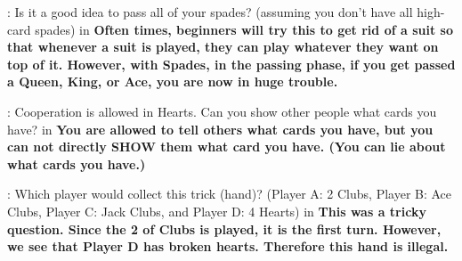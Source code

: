 \documentclass[11.5pt]{article}
\begin{document}
\vskip 0.16in

: Is it a good idea to pass all of your spades? (assuming you don't have all high-card spades)
 in
\indent \textbf{Often times, beginners will try this to get rid of a suit so that whenever a suit is played, they can play whatever they want on top of it. However, with Spades, in the passing phase, if you get passed a Queen, King, or Ace, you are now in huge trouble.}

\vskip 0.16in

: Cooperation is allowed in Hearts. Can you show other people what cards you have?
 in
\indent \textbf{You are allowed to tell others what cards you have, but you can not directly SHOW them what card you have. (You can lie about what cards you have.)}

\vskip 0.16in

: Which player would collect this trick (hand)? (Player A: 2 Clubs, Player B: Ace Clubs, Player C: Jack Clubs, and Player D: 4 Hearts)
 in
\indent \textbf{This was a tricky question. Since the 2 of Clubs is played, it is the first turn. However, we see that Player D has broken hearts. Therefore this hand is illegal.}
\end{document}
